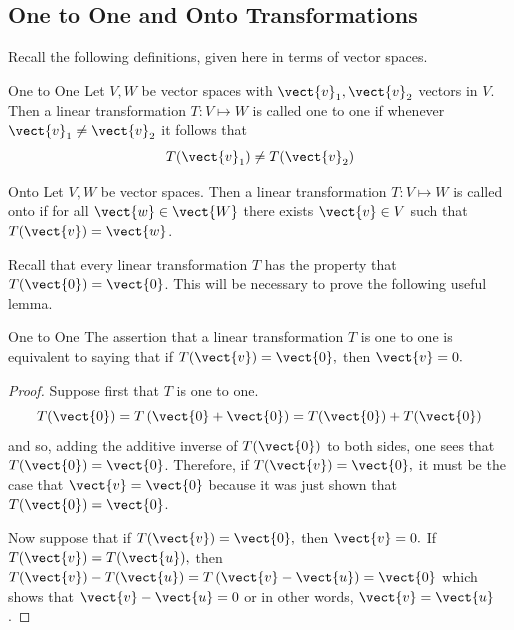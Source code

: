\subsection{One to One and Onto Transformations}

Recall the following definitions, given here in terms of vector spaces.

\begin{definition}{One to One}\label{def:onetoonevectorspace}
Let $V, W$ be vector spaces with $\vect{v}_1, \vect{v}_2$ vectors in $V$. Then a linear transformation $T: V \mapsto W$ is called one to one if whenever $\vect{v}_1 \neq \vect{v}_2$ it follows that 
\[
T(\vect{v}_1) \neq T (\vect{v}_2)
\]
\end{definition}

\begin{definition}{Onto}\label{def:ontovectorspace}
Let $V, W$ be vector spaces. Then a linear transformation $T: V \mapsto W$ is called onto if for all $\vect{w} \in \vect{W}$ there exists $\vect{v} \in V$ such that $T(\vect{v}) = \vect{w}$. 
\end{definition}

Recall that every linear transformation $T$ has the property that $T(\vect{0})=\vect{0}$. This will be necessary to prove the following useful lemma. 

\begin{lemma}{One to One}\label{lem:onetooneabstract}
The assertion that a linear transformation $T$ is one to one is equivalent to
saying that if $T(\vect{v})=\vect{0},$ then $\vect{v}=0.$ 
\end{lemma}

\begin{proof}
Suppose first that $T$ is one to one. 
\begin{equation*}
T(\vect{0})=T\left( \vect{0}+\vect{0}\right) =T(\vect{0})+T(\vect{0})
\end{equation*}
and so, adding the additive inverse of $T(\vect{0})$ to both sides, one sees
that $T(\vect{0})=\vect{0}$. Therefore, if $T(\vect{v})=\vect{0},$ it must be the
case that $\vect{v}=\vect{0}$ because it was just shown that $T(\vect{0})=\vect{0}$.

Now suppose that if $T(\vect{v})=\vect{0},$ then $\vect{v}=0.$ If $T(\vect{v})=T(\vect{u}),$ then $T(\vect{v})-T(\vect{u})=T\left( \vect{v}-\vect{u}\right) =\vect{0}$ which
shows that $\vect{v}-\vect{u}=0$ or in other words, $\vect{v}=\vect{u}$. 
\end{proof}

